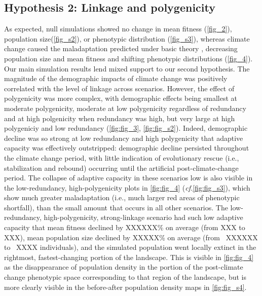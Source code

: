 \documentclass[9pt,twocolumn,twoside,lineno]{pnas-new}
\begin{document}
\subsection{Hypothesis 2: Linkage and polygenicity}
As expected, null simulations showed no change in mean fitness (\ref{fig_2}),
population size(\ref{fig_s2}), or phenotypic distribution (\ref{fig_s3}),
whereas climate change caused the maladaptation predicted under basic theory
\cite{aitken_whitlock},
decreasing population size and mean fitness and shifting phenotypic distributions (\ref{fig_4}).
Our main simulation results lend mixed support to our second hypothesis.
The magnitude of the demographic impacts of climate change was positively
correlated with the level of linkage across scenarios.
However, the effect of polygenicity
was more complex, with demographic effects being smallest at moderate polygenicity,
moderate at low polygenicity regardless of redundancy and at high polgenicity when redundancy was high,
but very large at high polygeniciy and low redundancy (\ref{fig:fig_3}, \ref{fig:fig_s2}).
Indeed, demographic decline was so strong at low redundancy and high polygenicity
that adaptive capacity was effectively outstripped: demographic decline persisted throughout
the climate change period, with little indication of evolutionary rescue
(i.e., stabilization and rebound) occurring until the artificial post-climate-change period.
The collapse of adaptive capacity in these scenarios
low is also visible in the low-redundancy, high-polygenicity plots in \ref{fig:fig_4}
(\textit{cf.}\ref{fig:fig_s3}),
which show much greater maladaptation (i.e., much larger red areas of phenotypic shortfall),
than the small amount that occurs in all other scenarios.
The low-redundancy, high-polygenicity, strong-linkage scenario had such low adaptive capacity
that mean fitness declined by XXXXXX\% on average (from XXX to XXX),
mean population size declined by XXXXX\% on average (from ~XXXXXX to ~XXXX individuals),
and the simulated population went locally extinct in the rightmost, fastest-changing portion of the landscape.
This is visible in \ref{fig:fig_4} as the disappearance of population density in the portion
of the post-climate change phenotypic space corresponding to that region of the landscape,
but is more clearly visible in the before-after population density maps in \ref{fig:fig_s4}.
\end{document}
